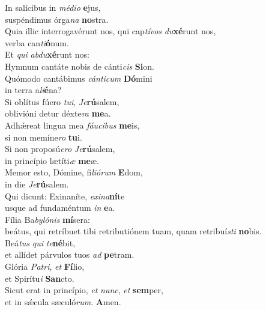 \evenverse In salícibus in \textit{mé}\textit{di}\textit{o} \textbf{e}jus,~\*\\
\evenverse suspéndimus órga\textit{na} \textbf{no}stra.\\
\oddverse Quia illic interrogavérunt nos, qui cap\textit{tí}\textit{vos} \textit{du}\textbf{xé}runt nos,~\*\\
\oddverse verba can\textit{ti}\textbf{ó}num.\\
\evenverse Et \textit{qui} \textit{ab}\textit{du}\textbf{xé}runt nos:~\*\\
\evenverse Hymnum cantáte nobis de cánti\textit{cis} \textbf{Si}on.\\
\oddverse Quómodo cantábimus \textit{cán}\textit{ti}\textit{cum} \textbf{Dó}mini~\*\\
\oddverse in terra a\textit{li}\textbf{é}na?\\
\evenverse Si oblítus fúero \textit{tu}\textit{i}, \textit{Je}\textbf{rú}salem,~\*\\
\evenverse oblivióni detur déxte\textit{ra} \textbf{me}a.\\
\oddverse Adhǽreat lingua mea \textit{fáu}\textit{ci}\textit{bus} \textbf{me}is,~\*\\
\oddverse si non memíne\textit{ro} \textbf{tu}i.\\
\evenverse Si non proposú\textit{e}\textit{ro} \textit{Je}\textbf{rú}salem,~\*\\
\evenverse in princípio lætíti\textit{æ} \textbf{me}æ.\\
\oddverse Memor esto, Dómine, fi\textit{li}\textit{ó}\textit{rum} \textbf{E}dom,~\*\\
\oddverse in die \textit{Je}\textbf{rú}salem.\\
\evenverse Qui dicunt: Exinaníte, \textit{e}\textit{xi}\textit{na}\textbf{ní}te~\*\\
\evenverse usque ad fundaméntum \textit{in} \textbf{e}a.\\
\oddverse Fília Ba\textit{by}\textit{ló}\textit{nis} \textbf{mí}sera:~\*\\
\oddverse beátus, qui retríbuet tibi retributiónem tuam, quam retribuí\textit{sti} \textbf{no}bis.\\
\evenverse Beá\textit{tus} \textit{qui} \textit{te}\textbf{né}bit,~\*\\
\evenverse et allídet párvulos tuos \textit{ad} \textbf{pe}tram.\\
\oddverse Glória \textit{Pa}\textit{tri}, \textit{et} \textbf{Fí}lio,~\*\\
\oddverse et Spirítu\textit{i} \textbf{San}cto.\\
\evenverse Sicut erat in princípio, \textit{et} \textit{nunc}, \textit{et} \textbf{sem}per,~\*\\
\evenverse et in sǽcula sæculó\textit{rum}. \textbf{A}men.\\
